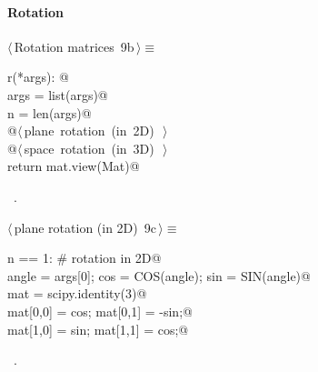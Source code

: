 \documentclass[11pt,oneside]{article}	%
\begin{document}
\paragraph{Rotation}
\begin{flushleft} \small \label{scrap21}
\protect{}$\langle\,$Rotation matrices\nobreak\ {\footnotesize 9b}$\,\rangle\equiv$
\vspace{-1ex}
\begin{list}{}{} \item
\mbox{}\verb@def r(*args): @\\
\mbox{}\verb@   args = list(args)@\\
\mbox{}\verb@   n = len(args)@\\
\mbox{}\verb@   @\hbox{$\langle\,$plane rotation (in 2D)\nobreak\ {\footnotesize {}}$\,\rangle$}\verb@@\\
\mbox{}\verb@   @\hbox{$\langle\,$space rotation (in 3D)\nobreak\ {\footnotesize {}}$\,\rangle$}\verb@@\\
\mbox{}\verb@   return mat.view(Mat)@\\
\mbox{}\verb@@{\NWsep}
\end{list}
\vspace{-1ex}
\footnotesize\addtolength{\baselineskip}{-1ex}
\begin{list}{}{\setlength{\itemsep}{-\parsep}\setlength{\itemindent}{-\leftmargin}}
\item \NWtxtMacroRefIn\ .
\end{list}
\end{flushleft}
\begin{flushleft} \small \label{scrap22}
\protect{}$\langle\,$plane rotation (in 2D)\nobreak\ {\footnotesize 9c}$\,\rangle\equiv$
\vspace{-1ex}
\begin{list}{}{} \item
\mbox{}\verb@if n == 1: # rotation in 2D@\\
\mbox{}\verb@   angle = args[0]; cos = COS(angle); sin = SIN(angle)@\\
\mbox{}\verb@   mat = scipy.identity(3)@\\
\mbox{}\verb@   mat[0,0] = cos;   mat[0,1] = -sin;@\\
\mbox{}\verb@   mat[1,0] = sin;   mat[1,1] = cos;@\\
\mbox{}\verb@@{\NWsep}
\end{list}
\vspace{-1ex}
\footnotesize\addtolength{\baselineskip}{-1ex}
\begin{list}{}{\setlength{\itemsep}{-\parsep}\setlength{\itemindent}{-\leftmargin}}
\item \NWtxtMacroRefIn\ .
\end{list}
\end{flushleft}
\end{document}
